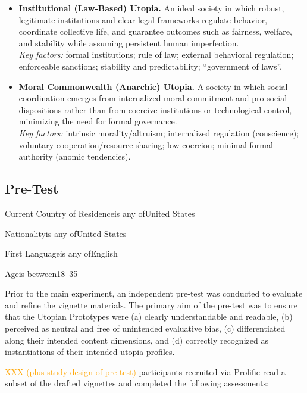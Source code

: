 \documentclass[jou,floatsintext]{apa7}
\begin{document}
\begin{itemize}
    \item \textbf{Institutional (Law-Based) Utopia.}  
    An ideal society in which robust, legitimate institutions and clear legal frameworks regulate behavior, coordinate collective life, and guarantee outcomes such as fairness, welfare, and stability while assuming persistent human imperfection. \\
    \textit{Key factors:} formal institutions; rule of law; external behavioral regulation; enforceable sanctions; stability and predictability; ``government of laws''.

    \item \textbf{Moral Commonwealth (Anarchic) Utopia.}  
    A society in which social coordination emerges from internalized moral commitment and pro-social dispositions rather than from coercive institutions or technological control, minimizing the need for formal governance. \\
    \textit{Key factors:} intrinsic morality/altruism; internalized regulation (conscience); voluntary cooperation/resource sharing; low coercion; minimal formal authority (anomic tendencies).
\end{itemize}


\subsection{Pre-Test}
\label{sec:pretest}

    Current Country of Residenceis any ofUnited States

    Nationalityis any ofUnited States

    First Languageis any ofEnglish

    Ageis between18–35



Prior to the main experiment, an independent pre-test was conducted to evaluate and refine the vignette materials. The primary aim of the pre-test was to ensure that the Utopian Prototypes were (a) clearly understandable and readable, (b) perceived as neutral and free of unintended evaluative bias, (c) differentiated along their intended content dimensions, and (d) correctly recognized as instantiations of their intended utopia profiles.


\textcolor{orange}{XXX (plus study design of pre-test)} participants recruited via Prolific read a subset of the drafted vignettes and completed the following assessments:
\end{document}
